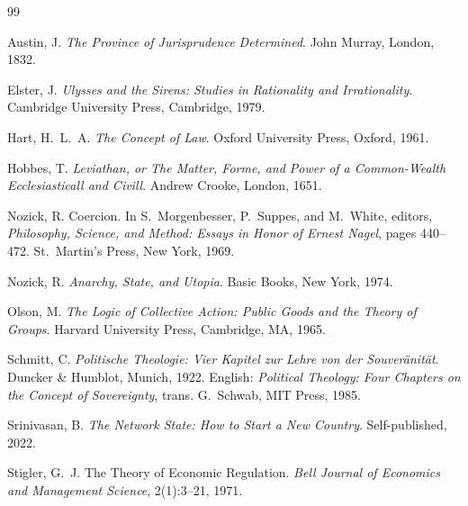 \documentclass[11pt,a4paper]{article}
\theoremstyle{remark}
\begin{document}

\begin{thebibliography}{99}

Austin, J.
\newblock \emph{The Province of Jurisprudence Determined}.
\newblock John Murray, London, 1832.

Elster, J.
\newblock \emph{Ulysses and the Sirens: Studies in Rationality
  and Irrationality}.
\newblock Cambridge University Press, Cambridge, 1979.

Hart, H.~L.~A.
\newblock \emph{The Concept of Law}.
\newblock Oxford University Press, Oxford, 1961.

Hobbes, T.
\newblock \emph{Leviathan, or The Matter, Forme, and Power of a
  Common-Wealth Ecclesiasticall and Civill}.
\newblock Andrew Crooke, London, 1651.

Nozick, R.
\newblock Coercion.
\newblock In S.~Morgenbesser, P.~Suppes, and M.~White, editors,
  \emph{Philosophy, Science, and Method: Essays in Honor of Ernest
  Nagel}, pages 440--472. St.~Martin's Press, New York, 1969.

Nozick, R.
\newblock \emph{Anarchy, State, and Utopia}.
\newblock Basic Books, New York, 1974.

Olson, M.
\newblock \emph{The Logic of Collective Action: Public Goods and
  the Theory of Groups}.
\newblock Harvard University Press, Cambridge, MA, 1965.

Schmitt, C.
\newblock \emph{Politische Theologie: Vier Kapitel zur Lehre von
  der Souver\"anit\"at}.
\newblock Duncker \& Humblot, Munich, 1922.
\newblock English: \emph{Political Theology: Four Chapters on the
  Concept of Sovereignty}, trans. G.~Schwab, MIT Press, 1985.

Srinivasan, B.
\newblock \emph{The Network State: How to Start a New Country}.
\newblock Self-published, 2022.

Stigler, G.~J.
\newblock The Theory of Economic Regulation.
\newblock \emph{Bell Journal of Economics and Management Science},
  2(1):3--21, 1971.


\end{thebibliography}
\end{document}
